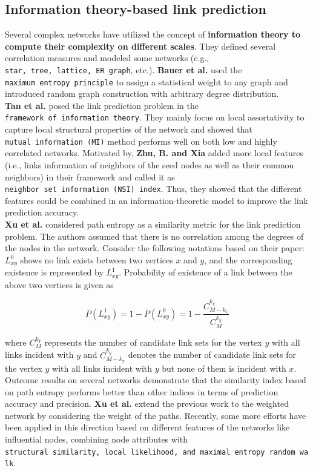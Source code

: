 \subsection{Information theory-based link prediction}

Several complex networks have utilized the concept of
\textbf{information theory to compute their complexity on different
    scales}. They defined several correlation measures and modeled some
networks (e.g., \texttt{star,\ tree,\ lattice,\ ER\ graph}, etc.).
\textbf{Bauer et al.} used the \texttt{maximum\ entropy\ principle} to
assign a statistical weight to any graph and introduced random graph
construction with arbitrary degree distribution.\\

\textbf{Tan et al.} posed the link prediction problem in the
\texttt{framework\ of\ information\ theory}. They mainly focus on local
assortativity to capture local structural properties of the network and
showed that \texttt{mutual\ information\ (MI)} method performs well on
both low and highly correlated networks. Motivated by, \textbf{Zhu, B.
    and Xia} added more local features (i.e., links information of neighbors
of the seed nodes as well as their common neighbors) in their framework
and called it as \texttt{neighbor\ set\ information\ (NSI)\ index}.
Thus, they showed that the different features could be combined in an
information-theoretic model to improve the link prediction accuracy.\\

\textbf{Xu et al.} considered path entropy as a similarity metric for
the link prediction problem. The authors assumed that there is no
correlation among the degrees of the nodes in the network. Consider the
following notations based on their paper: \(L^0_{xy}\) shows no link
exists between two vertices \(x\) and \(y\), and the corresponding
existence is represented by \(L^1_{xy}\). Probability of existence of a
link between the above two vertices is given as

\[
    P(L^1_{xy}) = 1 - P(L^0_{xy}) = 1 - \frac{C^{k_y}_{M-k_x}}{C^{k_y}_M}
\]

where \(C_M^{k_Y}\) represents the number of candidate link sets for the
vertex \(y\) with all links incident with \(y\) and \(C^{k_y}_{M-k_x}\)
denotes the number of candidate link sets for the vertex \(y\) with all
links incident with \(y\) but none of them is incident with \(x\).
Outcome results on several networks demonstrate that the similarity
index based on path entropy performs better than other indices in terms
of prediction accuracy and precision. \textbf{Xu et al.} extend the
previous work to the weighted network by considering the weight of the
paths. Recently, some more efforts have been applied in this direction
based on different features of the networks like influential nodes,
combining node attributes with
\texttt{structural\ similarity,\ local\ likelihood,\ and\ maximal\ entropy\ random\ walk}.

